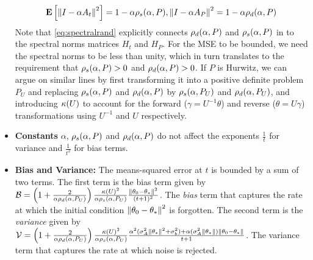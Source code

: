 \begin{itemize}[leftmargin=*, before = \leavevmode\vspace{-\baselineskip}]
\begin{comment}
\begin{align}\label{eq:errec}
\theta_t&=\theta_{t-1}+\alpha(b_t-A_t\theta_{t-1})\nn\\
\theta_t-\ts&=\theta_{t-1}-\ts+\alpha\left(b_t-A_t(\theta_{t-1}-\ts+\ts)\right)\nn\\
e_t&=e_{t-1}+\alpha(b_t-A_t e_t -A_t\ts)\nn\\
e_t&=\underbrace{((I-\alpha A_t))}_{\text{Random-Matrix}} e_{t-1}+\underbrace{\alpha(N_t -(M_t)\ts)}_{\text{Noise}}
\end{align}
From \eqref{errec} it is clear that the error dynamics depends on the $i)$ properties of the random matrix, $ii)$ properties of the noise. In the absence of the noise term in \eqref{eq:errec}, we have $e_t=(I-\alpha A_t) e_{t-1}=\Pi_{s=1}(I-\alpha A_s) e_0$, i.e., the initial error is get multiplied by a product of random matrices. In such a scenario, we can guess that whether or not the algorithm forgets the bias $\norm{\theta_0-\ts}$, depends on whether the matrix product is contracting. One way to characterize this contracting property is to look at the spectral radius of the random matrix, which is given by
\end{comment}
\begin{align}\label{eq:spectralrand}
\mathbf{E}\left[\left\| I-\alpha A_t\right\|^2\right]=1-\alpha \rho_s(\alpha,P), {\left\| I-\alpha A_P\right\|^2}=1-\alpha \rho_d(\alpha,P)
\end{align}
Note that \eqref{eq:spectralrand} explicitly connects $\rho_d(\alpha,P)$ and $\rho_s(\alpha,P)$ in  to the spectral norms matrices $H_t$ and $H_P$. For the MSE to be bounded, we need the spectral norms to be less than unity, which in turn translates to the requirement that $\rho_s(\alpha,P)>0$ and $\rho_d(\alpha,P)>0$. If $P$ is Hurwitz, we can argue on similar lines by first transforming it into a positive definite problem $P_U$ and replacing $\rho_s(\alpha,P)$ and $\rho_d(\alpha,P)$ by $\rho_s(\alpha,P_U)$ and $\rho_d(\alpha,P_U)$, and introducing $\kappa(U)$ to account for the forward ($\gamma=U^{-1}\theta$) and reverse ($\theta=U\gamma$) transformations using $U^{-1}$ and $U$ respectively.
\item \textbf{Constants} {$\alpha$, $\rho_s(\alpha,P)$ and $\rho_d(\alpha,P)$} do not affect the exponents $\frac{1}{t}$ for variance and $\frac{1}{t^2}$ for bias terms.
\item \textbf{Bias and Variance:} The means-squared error at $t$ is bounded by a sum of two terms. The first term is the bias term given by $\mathcal{B}=\left(1+\frac2{\alpha\rho_d(\alpha,P_U)}\right)\frac{\kappa(U)^2}{\alpha \rho_s(\alpha,P_U)}\frac{\left\| \theta_0-\theta_*\right\|^2}{(t+1)^2}$.  The \emph{bias} term that captures the rate at which the initial condition $\left\| \theta_0-\theta_*\right\|^2$ is forgotten. The second term is the \emph{variance} given by $\mathcal{V}=\left(1+\frac2{\alpha\rho_d(\alpha,P_U)}\right)\frac{\kappa(U)^2}{\alpha \rho_s(\alpha,P_U)} \frac{\alpha^2(\sigma_A^2\left\| \theta_*\right\|^2+\sigma_b^2)+\alpha (\sigma_A^2\left\| \theta_*\right\|)\left\| \theta_0-\theta_*\right\|}{t+1} $. The variance term that captures the rate at which noise is rejected.

\end{itemize}
